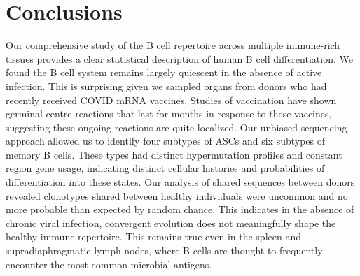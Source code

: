 \section{Conclusions}
Our comprehensive study of the B cell repertoire across multiple immune-rich tissues provides a clear statistical description of human B cell differentiation. We found the B cell system remains largely quiescent in the absence of active infection. This is surprising given we sampled organs from donors who had recently received COVID mRNA vaccines. Studies of vaccination have shown germinal centre reactions that last for months in response to these vaccines\cite{turner2021sars}, suggesting these ongoing reactions are quite localized. Our unbiased sequencing approach allowed us to identify four subtypes of ASCs and six subtypes of memory B cells. These types had distinct hypermutation profiles and constant region gene usage, indicating distinct cellular histories and probabilities of differentiation into these states. Our analysis of shared sequences between donors revealed clonotypes shared between healthy individuals were uncommon and no more probable than expected by random chance. This indicates in the absence of chronic viral infection\cite{setliff2018multi}, convergent evolution does not meaningfully shape the healthy immune repertoire. This remains true even in the spleen and supradiaphragmatic lymph nodes, where B cells are thought to frequently encounter the most common microbial antigens.   

